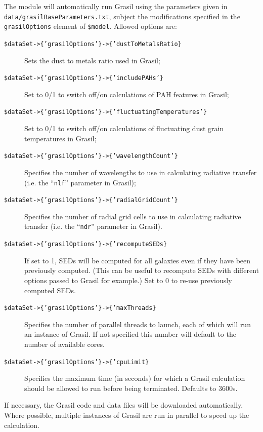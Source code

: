 The module will automatically run {\sc Grasil} using the parameters given in {\tt data/grasilBaseParameters.txt}, subject the modifications specified in the {\tt grasilOptions} element of {\tt \$model}. Allowed options are:
\begin{description}
 \item [{\tt \$dataSet-\textgreater\{'grasilOptions'\}-\textgreater\{'dustToMetalsRatio\}}] Sets the dust to metals ratio used in {\sc Grasil};
 \item [{\tt \$dataSet-\textgreater\{'grasilOptions'\}-\textgreater\{'includePAHs'\}}] Set to 0/1 to switch off/on calculations of PAH features in {\sc Grasil};
 \item [{\tt \$dataSet-\textgreater\{'grasilOptions'\}-\textgreater\{'fluctuatingTemperatures'\}}] Set to 0/1 to switch off/on calculations of fluctuating dust grain temperatures in {\sc Grasil};
 \item [{\tt \$dataSet-\textgreater\{'grasilOptions'\}-\textgreater\{'wavelengthCount'\}}] Specifies the number of wavelengths to use in calculating radiative transfer (i.e. the ``{\tt nlf}'' parameter in {\sc Grasil});
 \item [{\tt \$dataSet-\textgreater\{'grasilOptions'\}-\textgreater\{'radialGridCount'\}}] Specifies the number of radial grid cells to use in calculating radiative transfer (i.e. the ``{\tt ndr}'' parameter in {\sc Grasil}).
 \item [{\tt \$dataSet-\textgreater\{'grasilOptions'\}-\textgreater\{'recomputeSEDs\}}] If set to 1, SEDs will be computed for all galaxies even if they have been previously computed. (This can be useful to recompute SEDs with different options passed to {\sc Grasil} for example.) Set to 0 to re-use previously computed SEDs.
 \item [{\tt \$dataSet-\textgreater\{'grasilOptions'\}-\textgreater\{'maxThreads\}}] Specifies the number of parallel threads to launch, each of which will run an instance of {\sc Grasil}. If not specified this number will default to the number of available cores.
 \item [{\tt \$dataSet-\textgreater\{'grasilOptions'\}-\textgreater\{'cpuLimit\}}] Specifies the maximum time (in seconds) for which a Grasil calculation should be allowed to run before being terminated. Defaults to 3600s.
\end{description}
If necessary, the {\sc Grasil} code and data files will be downloaded automatically. Where possible, multiple instances of {\sc Grasil} are run in parallel to speed up the calculation.

